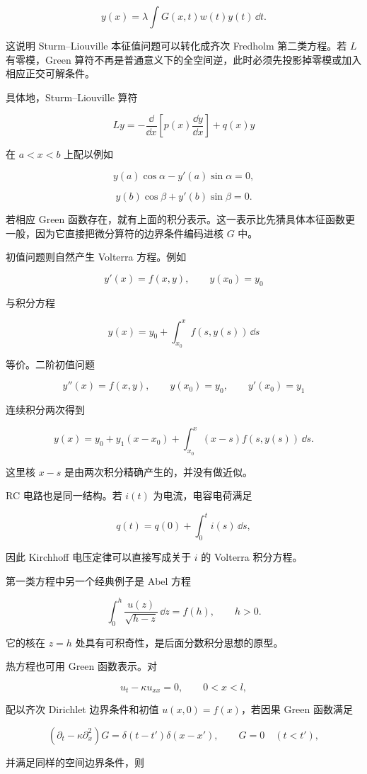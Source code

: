 \[
\boxed{
y(x)=\lambda\int G(x,t)w(t)y(t)\,\dd t
}.
\]

这说明 Sturm--Liouville 本征值问题可以转化成齐次 Fredholm 第二类方程。若 $L$ 有零模，Green 算符不再是普通意义下的全空间逆，此时必须先投影掉零模或加入相应正交可解条件。

具体地，Sturm--Liouville 算符

\[
L y=-\frac{\dd}{\dd x}
\left[p(x)\frac{\dd y}{\dd x}\right]+q(x)y
\]

在 $a<x<b$ 上配以例如

\[
y(a)\cos\alpha-y'(a)\sin\alpha=0,
\]

\[
y(b)\cos\beta+y'(b)\sin\beta=0.
\]

若相应 Green 函数存在，就有上面的积分表示。这一表示比先猜具体本征函数更一般，因为它直接把微分算符的边界条件编码进核 $G$ 中。

初值问题则自然产生 Volterra 方程。例如

\[
y'(x)=f(x,y),\qquad y(x_0)=y_0
\]

与积分方程

\[
\boxed{
y(x)=y_0+\int_{x_0}^x f(s,y(s))\,\dd s
}
\]

等价。二阶初值问题

\[
y''(x)=f(x,y),
\qquad y(x_0)=y_0,
\qquad y'(x_0)=y_1
\]

连续积分两次得到

\[
\boxed{
y(x)=y_0+y_1(x-x_0)
+\int_{x_0}^x(x-s)f(s,y(s))\,\dd s
}.
\]

这里核 $x-s$ 是由两次积分精确产生的，并没有做近似。

RC 电路也是同一结构。若 $i(t)$ 为电流，电容电荷满足

\[
q(t)=q(0)+\int_0^t i(s)\,\dd s,
\]

因此 Kirchhoff 电压定律可以直接写成关于 $i$ 的 Volterra 积分方程。

第一类方程中另一个经典例子是 Abel 方程

\[
\int_0^h\frac{u(z)}{\sqrt{h-z}}\,\dd z=f(h),
\qquad h>0.
\]

它的核在 $z=h$ 处具有可积奇性，是后面分数积分思想的原型。

热方程也可用 Green 函数表示。对

\[
u_t-\kappa u_{xx}=0,
\qquad 0<x<l,
\]

配以齐次 Dirichlet 边界条件和初值 $u(x,0)=f(x)$，若因果 Green 函数满足

\[
(\partial_t-\kappa\partial_x^2)G
=\delta(t-t')\delta(x-x'),
\qquad G=0\quad(t<t'),
\]

并满足同样的空间边界条件，则

